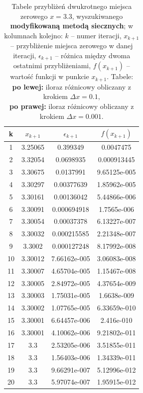 \begin{table}[!htp]
	\centering
	\label{drugie}
	\caption{Tabele przybliżeń dwukrotnego miejsca zerowego $ x = 3.3 $, wyszukiwanego \textbf{modyfikowaną metodą siecznych}; w kolumnach kolejno: $ k $ – numer iteracji, $ x_{k+1} $ – przybliżenie miejsca zerowego w danej iteracji, $\epsilon_{k+1}$ – różnica między dwoma ostatnimi przybliżeniami, $ f(x_{k+1}) $ – wartość funkcji w punkcie $ x_{k+1} $. Tabele:\\\textbf{po lewej:} iloraz różnicowy obliczany z krokiem $ \Delta x = 0.1 $, \\\textbf{po prawej:} iloraz różnicowy obliczany z krokiem $ \Delta x = 0.001 $.}
	\begin{tabular}{|c|c|c|c|}
		\hline
		k&$x_{k+1}$&$\epsilon_{k+1} $&$ f(x_{k+1})$ \\ \hline
		1&3.25065&0.399349&0.0047475 \\ \hline
		2&3.32054&0.0698935&0.000913445 \\ \hline
		3&3.30675&0.0137991&9.65125e-005 \\ \hline
		4&3.30297&0.00377639&1.85962e-005 \\ \hline
		5&3.30161&0.00136042&5.44866e-006 \\ \hline
		6&3.30091&0.000694918&1.7565e-006 \\ \hline
		7&3.30054&0.00037378&6.13227e-007 \\ \hline
		8&3.30032&0.000215585&2.21348e-007 \\ \hline
		9&3.3002&0.000127248&8.17992e-008 \\ \hline
		10&3.30012&7.66162e-005&3.06083e-008 \\ \hline
		11&3.30007&4.65704e-005&1.15467e-008 \\ \hline
		12&3.30005&2.84972e-005&4.37654e-009 \\ \hline
		13&3.30003&1.75031e-005&1.6638e-009 \\ \hline
		14&3.30002&1.07765e-005&6.33659e-010 \\ \hline
		15&3.30001&6.64457e-006&2.416e-010 \\ \hline
		16&3.30001&4.10062e-006&9.21802e-011 \\ \hline
		17&3.3&2.53205e-006&3.51855e-011 \\ \hline
		18&3.3&1.56403e-006&1.34339e-011 \\ \hline
		19&3.3&9.66291e-007&5.12996e-012 \\ \hline
		20&3.3&5.97074e-007&1.95915e-012 \\ \hline
	\end{tabular}

\end{table}
